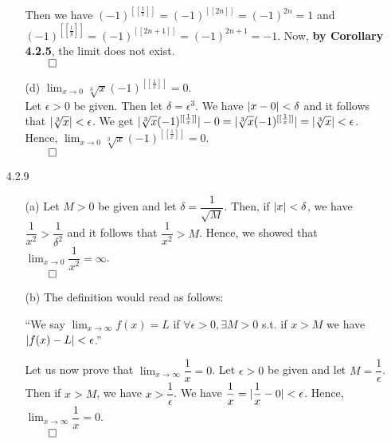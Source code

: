\documentclass[11pt]{article}
\DeclarePairedDelimiter\abs{\lvert}{\rvert}%
\begin{document}
\begin{itemize}
\begin{itemize}
                Then we have $(-1)^{[[\frac{1}{x}]]} = (-1)^{[[2n]]} =
                (-1)^{2n} = 1$ and $(-1)^{[[\frac{1}{y}]]} = (-1)^{[[2n + 1]]}
                = (-1)^{2n + 1} = -1$. Now, \textbf{by Corollary 4.2.5}, the
                limit does not exist.\\
                $\qed$

            \item[(d)]
                $\lim_{x \to 0} \sqrt[3]{x}(-1)^{[[\frac{1}{x}]]} = 0$.
                \\
                Let $\epsilon > 0$ be given. Then let $\delta = \epsilon^3$.
                We have $\abs{x - 0} < \delta$ and it follows that
                $\abs{\sqrt[3]{x}} < \epsilon$. We get
                $\abs{\sqrt[3]{x}(-1)^{[[\frac{1}{x}]]}} - 0 =
                \abs{\sqrt[3]{x}(-1)^{[[\frac{1}{x}]]}} = \abs{\sqrt[3]{x}} <
                \epsilon$. Hence, $\lim_{x \to 0}
                \sqrt[3]{x}(-1)^{[[\frac{1}{x}]]} = 0$.\\
                $\qed$
        \end{itemize}

    \newpage

    \item[4.2.9]
        \begin{itemize}
            \item[(a)]
                Let $M > 0$ be given and let $\delta = \dfrac{1}{\sqrt{M}}$.
                Then, if $\abs{x} < \delta$, we have $\dfrac{1}{x^2} >
                \dfrac{1}{\delta^2}$ and it follows that $\dfrac{1}{x^2} > M$.
                Hence, we showed that $\lim_{x \to 0} \dfrac{1}{x^2} =
                \infty$.\\
                $\qed$

            \item[(b)]
                The definition would read as follows:

                ``We say $\lim_{x \to \infty} f(x) = L$ if $\forall \epsilon >
                0, \exists M > 0$ s.t. if $x > M$ we have $\abs{f(x) - L} <
                \epsilon$.''

                Let us now prove that $\lim_{x \to \infty} \dfrac{1}{x} = 0$.
                Let $\epsilon > 0$ be given and let $M = \dfrac{1}{\epsilon}$.
                Then if $x > M$, we have $x > \dfrac{1}{\epsilon}$. We have
                $\dfrac{1}{x} = \abs{\dfrac{1}{x} - 0} < \epsilon$. Hence,
                $\lim_{x \to \infty} \dfrac{1}{x} = 0$.\\
                $\qed$


\end{itemize}
\end{itemize}
\end{document}

